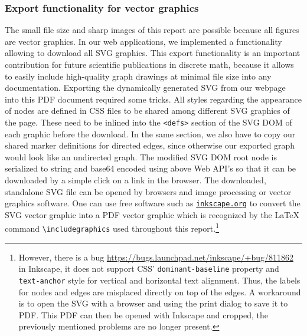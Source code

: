  

\subsubsection{Export functionality for vector graphics}\label{sec:svgExport} %
The small file size and sharp images of this report are possible because all figures are vector graphics. In our web applications, we implemented a functionality allowing to download all SVG graphics. This export functionality is an important contribution for future scientific publications in discrete math, because it allows to easily include high-quality graph drawings at minimal file size into any documentation.
Exporting the dynamically generated SVG from our webpage into this PDF document required some tricks. All styles regarding the appearance of nodes are defined in CSS files to be shared among different SVG graphics of the page. These need to be inlined into the \texttt{<defs>} section of the SVG DOM of each graphic before the download. In the same section, we also have to copy our shared marker definitions for directed edges, since otherwise our exported graph would look like an undirected graph. The modified SVG DOM root node is serialized to string and base64 encoded using above Web API's so that it can be downloaded by a simple click on a link in the browser. 
The downloaded, standalone SVG file can be opened by browsers and image processing or vector graphics software. One can use free software such as \texttt{\href{https://inkscape.org}{inkscape.org}} to convert the SVG vector graphic into a PDF vector graphic which is recognized by the \LaTeX{} command \texttt{\textbackslash includegraphics} used throughout this report.\footnote{However, there is a bug \url{https://bugs.launchpad.net/inkscape/+bug/811862} in Inkscape, it does not support CSS' \texttt{dominant-baseline} property and \texttt{text-anchor} style for vertical and horizontal text alignment. Thus, the labels for nodes and edges are misplaced directly on top of the edges. A workaround is to open the SVG with a browser and using the print dialog to save it to PDF. This PDF can then be opened with Inkscape and cropped, the previously mentioned problems are no longer present.}
